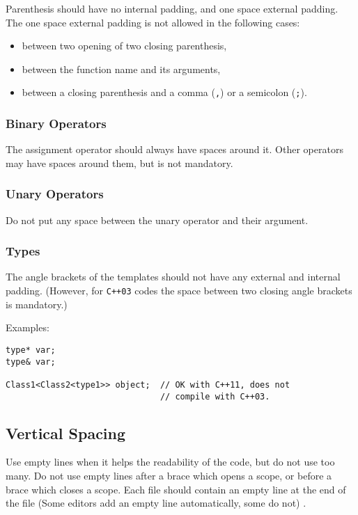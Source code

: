 \documentclass[a4paper]{article}
\newcommand{\inlinecode}[1]{\lstinline|#1|}
\begin{document}
Parenthesis should have no internal padding, and one space external padding.
The one space external padding is not allowed in the following cases:
\begin{itemize} \itemsep -3pt
 \vspace{-2ex}
 \item between two opening of two closing parenthesis,
 \item between the function name and its arguments,
 \item between a closing parenthesis and a comma (\inlinecode{,}) or a semicolon (\inlinecode{;}).
\end{itemize}

\subsubsection{Binary Operators}

The assignment operator should always have spaces around it. Other operators may have spaces around them, but is not mandatory.

\subsubsection{Unary Operators}

Do not put any space between the unary operator and their argument.

\subsubsection{Types}

The angle brackets of the templates should not have any external and internal padding.
(However, for \texttt{C++03} codes the space between two closing angle brackets is mandatory.)

Examples:
\begin{lstlisting}
type* var;
type& var;

Class1<Class2<type1>> object;  // OK with C++11, does not
                               // compile with C++03.
\end{lstlisting}

\subsection{Vertical Spacing}

Use empty lines when it helps the readability of the code, but do not use too many.
Do not use empty lines after a brace which opens a scope,
or before a brace which closes a scope.
Each file should contain an empty line at the end of the file (Some editors add an empty line automatically, some do not) .
\end{document}
